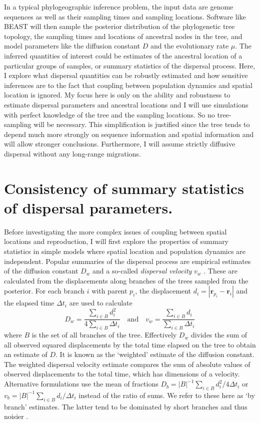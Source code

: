 \documentclass[aps,rmp, twocolumn]{revtex4}
\newcommand{\rvec}{\mathbf{r}}
\begin{document}
In a typical phylogeographic inference problem, the input data are genome sequences as well as their sampling times and sampling locations.
Software like BEAST will then sample the posterior distribution of the phylogenetic tree topology, the sampling times and locations of ancestral nodes in the tree, and model parameters like the diffusion constant $D$ and the evolutionary rate $\mu$.
The inferred quantities of interest could be estimates of the ancestral location of a particular groups of samples, or summary statistics of the dispersal process.
Here, I explore what dispersal quantities can be robustly estimated and how sensitive inferences are to the fact that coupling between population dynamics and spatial location is ignored.
My focus here is only on the ability and robustness to estimate dispersal parameters and ancestral locations and I will use simulations with perfect knowledge of the tree and the sampling locations.
So no tree-sampling will be necessary.
This simplification is justified since the tree tends to depend much more strongly on sequence information and spatial information and will allow stronger conclusions.
Furthermore, I will assume strictly diffusive dispersal without any long-range migrations.


\section*{Consistency of summary statistics of dispersal parameters.}
Before investigating the more complex issues of coupling between spatial locations and reproduction, I will first explore the properties of summary statistics in simple models where spatial location and population dynamics are independent.
Popular summaries of the dispersal process are empirical estimates of the diffusion constant $D_w$ \citep{pybus_unifying_2012,trovao_bayesian_2015} and a so-called \emph{dispersal velocity} $v_w$ \citep{dellicour_using_2017}.
These are calculated from the displacements along branches of the trees sampled from the posterior.
For each branch $i$ with parent $p_i$, the displacement $d_i = |\rvec_{p_i} - \rvec_{i}|$ and the elapsed time $\Delta t_i$ are used to calculate
\begin{equation}
    \label{eq:dispersal_parameters}
    D_w = \frac{\sum_{i\in B}d_i^2}{4\sum_{i\in B} \Delta t_i} \quad \mathrm{and}  \quad v_w = \frac{\sum_{i\in B} d_i}{\sum_{i\in B} \Delta t_i}
\end{equation}
where $B$ is the set of all branches of the tree.
Effectively $D_w$ divides the sum of all observed squared displacements by the total time elapsed on the tree to obtain an estimate of $D$.
It is known as the `weighted' estimate of the diffusion constant.
The weighted dispersal velocity estimate compares the sum of absolute values of observed displacements to the total time, which has dimensions of a velocity.
Alternative formulations use the mean of fractions $D_b = |B|^{-1} \sum_{i\in B}d_i^2/4\Delta t_i$ or $v_b = |B|^{-1} \sum_{i\in B}d_i/\Delta t_i$ instead of the ratio of sums.
We refer to these here as `by branch' estimates.
The latter tend to be dominated by short branches and thus noisier \citep{trovao_bayesian_2015}.
\end{document}
